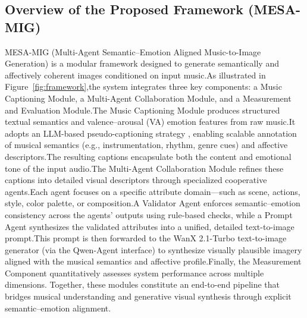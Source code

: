 \documentclass[letterpaper]{article}
\begin{document}
\subsection{Overview of the Proposed Framework (MESA-MIG)}
MESA-MIG (Multi-Agent Semantic–Emotion Aligned Music-to-Image Generation) is a modular framework designed to generate semantically and affectively coherent images conditioned on input music.As illustrated in Figure~\ref{fig:framework},the system integrates three key components: a Music Captioning Module, a Multi-Agent Collaboration Module, and a Measurement and Evaluation Module.The Music Captioning Module produces structured textual semantics and valence–arousal (VA) emotion features from raw music.It adopts an LLM-based pseudo-captioning strategy \cite{doh2023lp}, enabling scalable annotation of musical semantics (e.g., instrumentation, rhythm, genre cues) and affective descriptors.The resulting captions encapsulate both the content and emotional tone of the input audio.The Multi-Agent Collaboration Module \cite{xie2025anywhere} refines these captions into detailed visual descriptors through specialized cooperative agents.Each agent focuses on a specific attribute domain—such as scene, actions, style, color palette, or composition.A Validator Agent enforces semantic–emotion consistency  \cite{zhao2020emotion}across the agents’ outputs using rule-based checks, while a Prompt Agent synthesizes the validated attributes into a unified, detailed text-to-image prompt.This prompt is then forwarded to the WanX 2.1-Turbo text-to-image generator (via the Qwen-Agent interface) \cite{alibaba2024wanx,bai2024qwenagent} to synthesize visually plausible imagery aligned with the musical semantics and affective profile.Finally, the Measurement Component quantitatively assesses system performance across multiple dimensions.
Together, these modules constitute an end-to-end pipeline that bridges musical understanding and generative visual synthesis through explicit semantic–emotion alignment.
\end{document}
